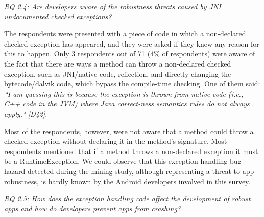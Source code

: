 \bigskip
\noindent\emph{RQ 2.4: Are developers aware of the robustness threats caused by JNI undocumented checked exceptions?}
\bigskip

The respondents were presented with a piece of code in which a non-declared checked exception has appeared, and they were asked if they knew any reason for this to happen. Only 3 respondents out of 71 (4\% of respondents) were aware of the fact that there are ways a method can throw a non-declared checked exception, such as JNI/native code, reflection, and directly changing the bytecode/dalvik code, which bypass the compile-time checking. One of them said: \emph{``I am guessing this is because the exception is thrown from native code (i.e., C++ code in the JVM) where Java correct-ness semantics rules do not always apply." [D42]}.

Most of the respondents, however, were not aware that a method could throw a checked exception without declaring it in the method's signature. Most respondents mentioned that if a method throws a non-declared exception it must be a RuntimeException. We could observe that this exception handling bug hazard detected during the mining study, although representing a threat to app robustness, is hardly known by the Android developers involved in this survey.

\bigskip


\bigskip


\noindent\emph{RQ 2.5: How does the exception handling code affect the development of robust apps and how do developers prevent apps from crashing?}

\bigskip

